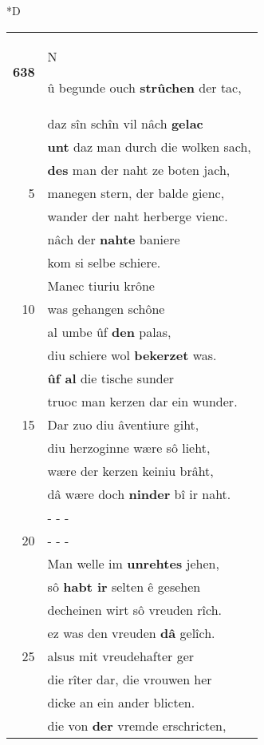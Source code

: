\documentclass[8pt,a4paper,notitlepage]{article}
\begin{document}
\begin{table}[ht]
\begin{minipage}[t]{0.5\linewidth}
\small
\begin{center}*D
\end{center}
\begin{tabular}{rl}
\textbf{638} & \begin{large}N\end{large}û begunde ouch \textbf{strûchen} der tac,\\ 
 & daz sîn schîn vil nâch \textbf{gelac}\\ 
 & \textbf{unt} daz man durch die wolken sach,\\ 
 & \textbf{des} man der naht ze boten jach,\\ 
5 & manegen stern, der balde gienc,\\ 
 & wander der naht herberge vienc.\\ 
 & nâch der \textbf{nahte} baniere\\ 
 & kom si selbe schiere.\\ 
 & Manec tiuriu krône\\ 
10 & was gehangen schône\\ 
 & al umbe ûf \textbf{den} palas,\\ 
 & diu schiere wol \textbf{bekerzet} was.\\ 
 & \textbf{ûf al} die tische sunder\\ 
 & truoc man kerzen dar ein wunder.\\ 
15 & Dar zuo diu âventiure giht,\\ 
 & diu herzoginne wære sô lieht,\\ 
 & wære der kerzen keiniu brâht,\\ 
 & dâ wære doch \textbf{ninder} bî ir naht.\\ 
 & \multicolumn{1}{l}{ - - - }\\ 
20 & \multicolumn{1}{l}{ - - - }\\ 
 & Man welle im \textbf{unrehtes} jehen,\\ 
 & sô \textbf{habt ir} selten ê gesehen\\ 
 & decheinen wirt sô vreuden rîch.\\ 
 & ez was den vreuden \textbf{dâ} gelîch.\\ 
25 & alsus mit vreudehafter ger\\ 
 & die rîter dar, die vrouwen her\\ 
 & dicke an ein ander blicten.\\ 
 & die von \textbf{der} vremde erschricten,\\ 

\end{tabular}
\end{minipage}
\end{table}
\end{document}
